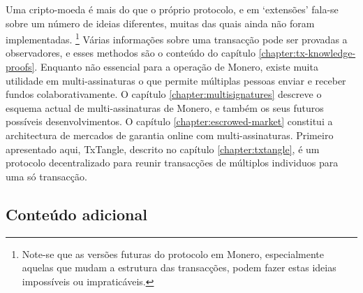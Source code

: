 Uma cripto-moeda é mais do que o próprio protocolo, e em `extensões' fala-se sobre um número de ideias diferentes, muitas das quais ainda não foram implementadas. 
\footnote{Note-se que as versões futuras do protocolo em Monero, especialmente aquelas que mudam a estrutura das transacções, podem fazer estas ideias impossíveis ou impraticáveis.}
Várias informações sobre uma transacção pode ser provadas a observadores, e esses methodos são o conteúdo do capítulo \ref{chapter:tx-knowledge-proofs}.
Enquanto não essencial para a operação de Monero, existe muita utilidade em multi-assinaturas o que permite múltiplas pessoas enviar e receber fundos colaborativamente.
O capítulo \ref{chapter:multisignatures} descreve o esquema actual de multi-assinaturas de Monero, e também os seus futuros possíveis desenvolvimentos.
O capítulo \ref{chapter:escrowed-market} constitui a architectura de mercados de garantia online com multi-assinaturas.  
Primeiro apresentado aqui, TxTangle, descrito no capítulo \ref{chapter:txtangle}, é um protocolo decentralizado para reunir transacções de múltiplos individuos para uma só transacção.



\subsection{Conteúdo adicional}

